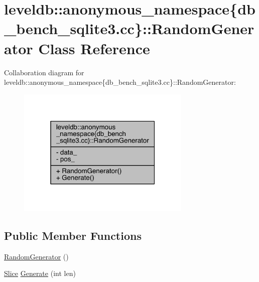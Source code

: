 \hypertarget{classleveldb_1_1anonymous__namespace_02db__bench__sqlite3_8cc_03_1_1_random_generator}{}\section{leveldb\+:\+:anonymous\+\_\+namespace\{db\+\_\+bench\+\_\+sqlite3.\+cc\}\+:\+:Random\+Generator Class Reference}
\label{classleveldb_1_1anonymous__namespace_02db__bench__sqlite3_8cc_03_1_1_random_generator}


Collaboration diagram for leveldb\+:\+:anonymous\+\_\+namespace\{db\+\_\+bench\+\_\+sqlite3.\+cc\}\+:\+:Random\+Generator\+:
\nopagebreak
\begin{figure}[H]
\begin{center}
\leavevmode
\includegraphics[width=235pt]{classleveldb_1_1anonymous__namespace_02db__bench__sqlite3_8cc_03_1_1_random_generator__coll__graph}
\end{center}
\end{figure}
\subsection*{Public Member Functions}
\begin{DoxyCompactItemize}
\item 
\hyperlink{classleveldb_1_1anonymous__namespace_02db__bench__sqlite3_8cc_03_1_1_random_generator_ad5e6c37e112a97f0e7ebd1a34c564d18}{Random\+Generator} ()
\item 
\hyperlink{classleveldb_1_1_slice}{Slice} \hyperlink{classleveldb_1_1anonymous__namespace_02db__bench__sqlite3_8cc_03_1_1_random_generator_a6d511cba1ecc420b6a06fcad6ff6ac31}{Generate} (int len)
\end{DoxyCompactItemize}
